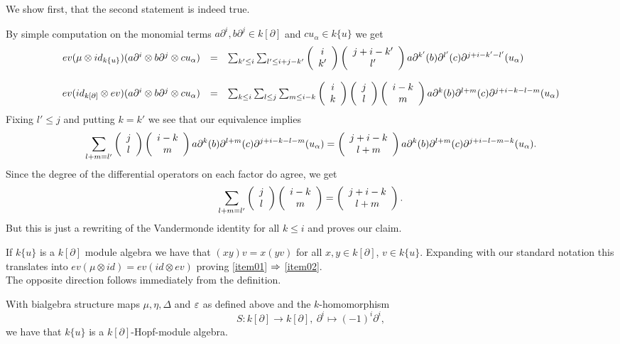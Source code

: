 \bws We show first, that the second statement is indeed true.
\bn
\item By simple computation on the monomial terms $a \partial^i, b \partial^j \in k[\partial]$ and $c u_\alpha \in k\{u\}$ we get
{\scriptsize
$$\bao{rcl}
ev(\mu \otimes id_{k\{u\}})(a \partial^i \otimes b \partial^j \otimes c u_\alpha) &=& \sum_{k' \leq i} \sum_{l' \leq i + j - k'} \left(\bao{c}i\\k'\ea\right) \left(\bao{c}j + i - k'\\l'\ea\right) a \partial^{k'}(b) \partial^{l'}(c) \partial^{j+i-k'-l'}(u_\alpha)\\
&&\\
ev(id_{k[\partial]} \otimes ev)(a \partial^i \otimes b \partial^j \otimes c u_\alpha) &=& \sum_{k \leq i} \sum_{l \leq j} \sum_{m \leq i - k} \left(\bao{c}i\\k\ea\right) \left(\bao{c}j\\l\ea\right) \left(\bao{c}i - k\\m\ea\right) a \partial^k(b) \partial^{l+m}(c) \partial^{j+i-k-l-m}(u_\alpha)\\
\ea$$}
Fixing $l' \leq j$ and putting $k = k'$ we see that our equivalence implies $$\sum_{l + m = l'} \left(\bao{c}j\\l\ea\right) \left(\bao{c}i - k\\m\ea\right) a \partial^k(b) \partial^{l+m}(c) \partial^{j+i-k-l-m}(u_\alpha) = \left(\bao{c}j + i - k\\l + m\\\ea\right) a \partial^k(b) \partial^{l + m}(c) \partial^{j + i - l - m - k}(u_\alpha).$$
Since the degree of the differential operators on each factor do agree, we get
$$\sum_{l + m = l'} \left(\bao{c}j\\l\ea\right) \left(\bao{c}i - k\\m\ea\right) = \left(\bao{c}j + i - k\\l + m\\\ea\right).$$
But this is just a rewriting of the Vandermonde identity for all $k \leq i$ and proves our claim.
\item If $k\{u\}$ is a $k[\partial]$ module algebra we have that $(x y) v = x(y v)$ for all $x, y \in k[\partial]$, $v \in k\{u\}$. Expanding with our standard notation this translates into $ev(\mu\otimes id) = ev(id\otimes ev)$ proving \ref{item01} $\RA$ \ref{item02}.\\
The opposite direction follows immediately from the definition.
\en
\begin{koro}\label{HopfModAlgDiffPoly}
With bialgebra structure maps $\mu, \eta, %
\Delta$ and $ %
\eps$ as defined above and the $k$-homomorphism
$$S : k[\partial] \longrightarrow k[\partial],\ \partial^i \longmapsto (-1)^i \partial^i,$$
we have that $k\{u\}$ is a $k[\partial]$-Hopf-module algebra.
\end{koro}
